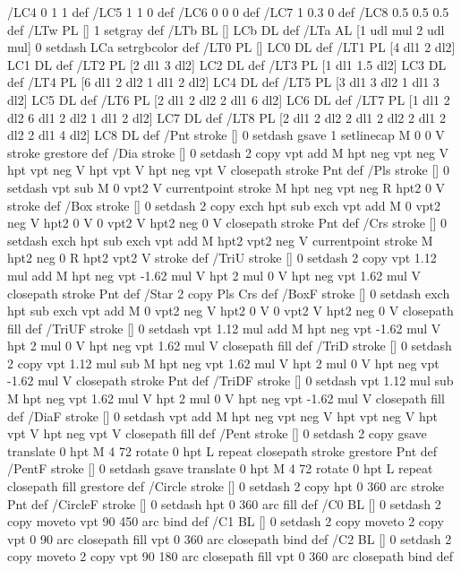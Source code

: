 /LC4 {0 1 1} def
/LC5 {1 1 0} def
/LC6 {0 0 0} def
/LC7 {1 0.3 0} def
/LC8 {0.5 0.5 0.5} def
/LTw {PL [] 1 setgray} def
/LTb {BL [] LCb DL} def
/LTa {AL [1 udl mul 2 udl mul] 0 setdash LCa setrgbcolor} def
/LT0 {PL [] LC0 DL} def
/LT1 {PL [4 dl1 2 dl2] LC1 DL} def
/LT2 {PL [2 dl1 3 dl2] LC2 DL} def
/LT3 {PL [1 dl1 1.5 dl2] LC3 DL} def
/LT4 {PL [6 dl1 2 dl2 1 dl1 2 dl2] LC4 DL} def
/LT5 {PL [3 dl1 3 dl2 1 dl1 3 dl2] LC5 DL} def
/LT6 {PL [2 dl1 2 dl2 2 dl1 6 dl2] LC6 DL} def
/LT7 {PL [1 dl1 2 dl2 6 dl1 2 dl2 1 dl1 2 dl2] LC7 DL} def
/LT8 {PL [2 dl1 2 dl2 2 dl1 2 dl2 2 dl1 2 dl2 2 dl1 4 dl2] LC8 DL} def
/Pnt {stroke [] 0 setdash gsave 1 setlinecap M 0 0 V stroke grestore} def
/Dia {stroke [] 0 setdash 2 copy vpt add M
  hpt neg vpt neg V hpt vpt neg V
  hpt vpt V hpt neg vpt V closepath stroke
  Pnt} def
/Pls {stroke [] 0 setdash vpt sub M 0 vpt2 V
  currentpoint stroke M
  hpt neg vpt neg R hpt2 0 V stroke
 } def
/Box {stroke [] 0 setdash 2 copy exch hpt sub exch vpt add M
  0 vpt2 neg V hpt2 0 V 0 vpt2 V
  hpt2 neg 0 V closepath stroke
  Pnt} def
/Crs {stroke [] 0 setdash exch hpt sub exch vpt add M
  hpt2 vpt2 neg V currentpoint stroke M
  hpt2 neg 0 R hpt2 vpt2 V stroke} def
/TriU {stroke [] 0 setdash 2 copy vpt 1.12 mul add M
  hpt neg vpt -1.62 mul V
  hpt 2 mul 0 V
  hpt neg vpt 1.62 mul V closepath stroke
  Pnt} def
/Star {2 copy Pls Crs} def
/BoxF {stroke [] 0 setdash exch hpt sub exch vpt add M
  0 vpt2 neg V hpt2 0 V 0 vpt2 V
  hpt2 neg 0 V closepath fill} def
/TriUF {stroke [] 0 setdash vpt 1.12 mul add M
  hpt neg vpt -1.62 mul V
  hpt 2 mul 0 V
  hpt neg vpt 1.62 mul V closepath fill} def
/TriD {stroke [] 0 setdash 2 copy vpt 1.12 mul sub M
  hpt neg vpt 1.62 mul V
  hpt 2 mul 0 V
  hpt neg vpt -1.62 mul V closepath stroke
  Pnt} def
/TriDF {stroke [] 0 setdash vpt 1.12 mul sub M
  hpt neg vpt 1.62 mul V
  hpt 2 mul 0 V
  hpt neg vpt -1.62 mul V closepath fill} def
/DiaF {stroke [] 0 setdash vpt add M
  hpt neg vpt neg V hpt vpt neg V
  hpt vpt V hpt neg vpt V closepath fill} def
/Pent {stroke [] 0 setdash 2 copy gsave
  translate 0 hpt M 4 {72 rotate 0 hpt L} repeat
  closepath stroke grestore Pnt} def
/PentF {stroke [] 0 setdash gsave
  translate 0 hpt M 4 {72 rotate 0 hpt L} repeat
  closepath fill grestore} def
/Circle {stroke [] 0 setdash 2 copy
  hpt 0 360 arc stroke Pnt} def
/CircleF {stroke [] 0 setdash hpt 0 360 arc fill} def
/C0 {BL [] 0 setdash 2 copy moveto vpt 90 450 arc} bind def
/C1 {BL [] 0 setdash 2 copy moveto
	2 copy vpt 0 90 arc closepath fill
	vpt 0 360 arc closepath} bind def
/C2 {BL [] 0 setdash 2 copy moveto
	2 copy vpt 90 180 arc closepath fill
	vpt 0 360 arc closepath} bind def
